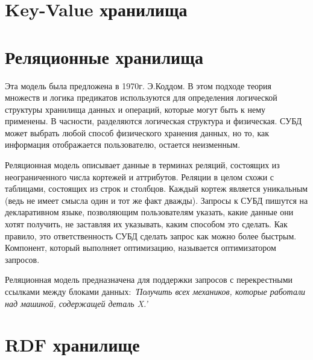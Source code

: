 \documentclass[specialist,subf,href,colorlinks=true
]{disser}
\begin{document}
\section{Key-Value хранилища}
\section{Реляционные хранилища}
Эта модель была предложена в 1970г. Э.Коддом. В этом подходе теория множеств и логика предикатов используются для определения логической структуры хранилища данных и операций, которые могут быть к нему применены. В часности, разделяются логическая структура и физическая. СУБД может выбрать любой способ физического хранения данных, но то, как информация отображается пользователю, остается неизменным.

Реляционная модель описывает данные в терминах реляций, состоящих из неограниченного числа кортежей и аттрибутов. Реляции в целом схожи с таблицами, состоящих из строк и столбцов. Каждый кортеж является уникальным (ведь не имеет смысла один и тот же факт дважды).  Запросы к СУБД пишутся на декларативном языке, позволяющим пользователям указать, какие данные они хотят получить, не заставляя их указывать, каким способом это сделать. Как правило, это ответственность СУБД сделать запрос как можно более быстрым. Компонент, который выполняет оптимизацию, называется оптимизатором запросов.

Реляционная модель предназначена для поддержки запросов с перекрестными ссылками между блоками данных: 
\textit{
  'Получить всех механиков, которые работали над машиной, содержащей деталь X.'
}

\section{RDF хранилище}
\end{document}
